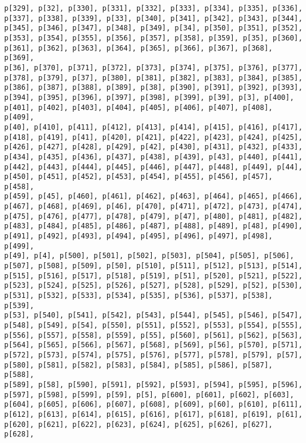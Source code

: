 \documentclass[
  letterpaper,
  DIV=11,
  numbers=noendperiod]{scrartcl}
\begin{document}
\begin{verbatim}
p[329], p[32], p[330], p[331], p[332], p[333], p[334], p[335], p[336],
p[337], p[338], p[339], p[33], p[340], p[341], p[342], p[343], p[344],
p[345], p[346], p[347], p[348], p[349], p[34], p[350], p[351], p[352],
p[353], p[354], p[355], p[356], p[357], p[358], p[359], p[35], p[360],
p[361], p[362], p[363], p[364], p[365], p[366], p[367], p[368], p[369],
p[36], p[370], p[371], p[372], p[373], p[374], p[375], p[376], p[377],
p[378], p[379], p[37], p[380], p[381], p[382], p[383], p[384], p[385],
p[386], p[387], p[388], p[389], p[38], p[390], p[391], p[392], p[393],
p[394], p[395], p[396], p[397], p[398], p[399], p[39], p[3], p[400],
p[401], p[402], p[403], p[404], p[405], p[406], p[407], p[408], p[409],
p[40], p[410], p[411], p[412], p[413], p[414], p[415], p[416], p[417],
p[418], p[419], p[41], p[420], p[421], p[422], p[423], p[424], p[425],
p[426], p[427], p[428], p[429], p[42], p[430], p[431], p[432], p[433],
p[434], p[435], p[436], p[437], p[438], p[439], p[43], p[440], p[441],
p[442], p[443], p[444], p[445], p[446], p[447], p[448], p[449], p[44],
p[450], p[451], p[452], p[453], p[454], p[455], p[456], p[457], p[458],
p[459], p[45], p[460], p[461], p[462], p[463], p[464], p[465], p[466],
p[467], p[468], p[469], p[46], p[470], p[471], p[472], p[473], p[474],
p[475], p[476], p[477], p[478], p[479], p[47], p[480], p[481], p[482],
p[483], p[484], p[485], p[486], p[487], p[488], p[489], p[48], p[490],
p[491], p[492], p[493], p[494], p[495], p[496], p[497], p[498], p[499],
p[49], p[4], p[500], p[501], p[502], p[503], p[504], p[505], p[506],
p[507], p[508], p[509], p[50], p[510], p[511], p[512], p[513], p[514],
p[515], p[516], p[517], p[518], p[519], p[51], p[520], p[521], p[522],
p[523], p[524], p[525], p[526], p[527], p[528], p[529], p[52], p[530],
p[531], p[532], p[533], p[534], p[535], p[536], p[537], p[538], p[539],
p[53], p[540], p[541], p[542], p[543], p[544], p[545], p[546], p[547],
p[548], p[549], p[54], p[550], p[551], p[552], p[553], p[554], p[555],
p[556], p[557], p[558], p[559], p[55], p[560], p[561], p[562], p[563],
p[564], p[565], p[566], p[567], p[568], p[569], p[56], p[570], p[571],
p[572], p[573], p[574], p[575], p[576], p[577], p[578], p[579], p[57],
p[580], p[581], p[582], p[583], p[584], p[585], p[586], p[587], p[588],
p[589], p[58], p[590], p[591], p[592], p[593], p[594], p[595], p[596],
p[597], p[598], p[599], p[59], p[5], p[600], p[601], p[602], p[603],
p[604], p[605], p[606], p[607], p[608], p[609], p[60], p[610], p[611],
p[612], p[613], p[614], p[615], p[616], p[617], p[618], p[619], p[61],
p[620], p[621], p[622], p[623], p[624], p[625], p[626], p[627], p[628],

\end{verbatim}
\end{document}
